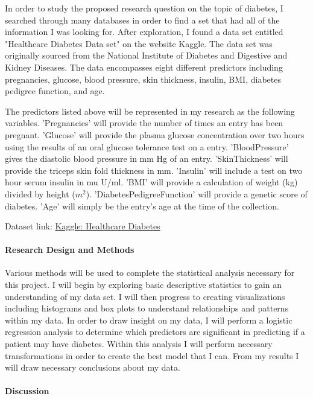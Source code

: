 \documentclass[12pt]{article}
\begin{document}
In order to study the proposed research question on the topic of diabetes, I searched through many databases in order to find a set that had all of the information I was looking for. After exploration, I found a data set entitled "Healthcare Diabetes Data set" on the website Kaggle. The data set was originally sourced from the National Institute of Diabetes and Digestive and Kidney Diseases. The data encompasses eight different predictors including pregnancies, glucose, blood pressure, skin thickness, insulin, BMI, diabetes pedigree function, and age.

The predictors listed above will be represented in my research as the following variables. 'Pregnancies' will provide the number of times an entry has been pregnant. 'Glucose' will provide the plasma glucose concentration over two hours using the results of an oral glucose tolerance test on a entry. 'BloodPressure' gives the diastolic blood pressure in mm Hg of an entry. 'SkinThickness' will provide the triceps skin fold thickness in mm. 'Insulin' will include a test on two hour serum insulin in mu U/ml. 'BMI' will provide a calculation of weight (kg) divided by height ($m^2$). 'DiabetesPedigreeFunction' will provide a genetic score of diabetes. 'Age' will simply be the entry's age at the time of the collection. 

Dataset link: \href{https://www.kaggle.com/datasets/nanditapore/healthcare-diabetes}{Kaggle: Healthcare Diabetes}


\paragraph{Research Design and Methods}
Various methods will be used to complete the statistical analysis necessary for this project. I will begin by exploring basic descriptive statistics to gain an understanding of my data set. I will then progress to creating visualizations including histograms and box plots to understand relationships and patterns within my data. In order to draw insight on my data, I will perform a logistic regression analysis to determine which predictors are significant in predicting if a patient may have diabetes. Within this analysis I will perform necessary transformations in order to create the best model that I can. From my results I will draw necessary conclusions about my data.


\paragraph{Discussion}
\end{document}
